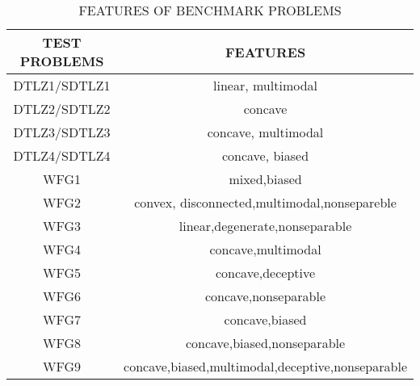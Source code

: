 \begin{table}[htbp]
  \centering
  \caption{FEATURES OF BENCHMARK PROBLEMS}
    \begin{tabular}{cc}
    \toprule
    TEST PROBLEMS & FEATURES \\
    \midrule
    DTLZ1/SDTLZ1 & linear, multimodal \\
    DTLZ2/SDTLZ2 & concave \\
    DTLZ3/SDTLZ3 & concave, multimodal \\
    DTLZ4/SDTLZ4 & concave, biased \\
    WFG1  & mixed,biased \\
    WFG2  & convex, disconnected,multimodal,nonsepareble \\
    WFG3  & linear,degenerate,nonseparable \\
    WFG4  & concave,multimodal \\
    WFG5  & concave,deceptive \\
    WFG6  & concave,nonseparable \\
    WFG7  & concave,biased \\
    WFG8  & concave,biased,nonseparable \\
    WFG9  & concave,biased,multimodal,deceptive,nonseparable \\
    \bottomrule
    \end{tabular}%
  \label{tab:feature}%
\end{table}%
